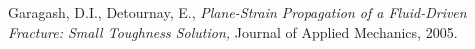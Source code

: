\documentclass{article}
\begin{document}
%
%
\clearpage 
\begin{thebibliography}{9}  
%
Garagash, D.I., Detournay, E.,
\emph{Plane-Strain Propagation of a Fluid-Driven Fracture: Small Toughness
Solution,}
Journal of Applied Mechanics,
2005.
%
%
\end{thebibliography}
\end{document}
